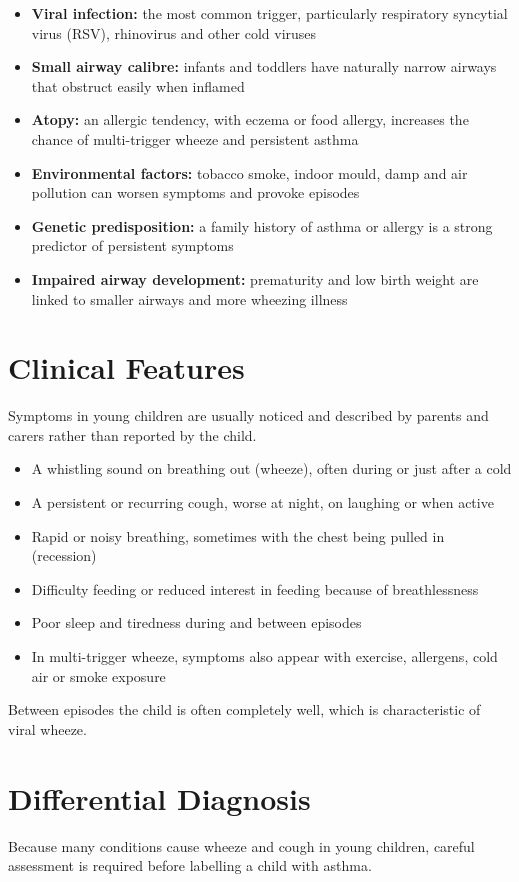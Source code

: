 \begin{itemize}
    \item \textbf{Viral infection:} the most common trigger, particularly respiratory syncytial virus (RSV), rhinovirus and other cold viruses
    \item \textbf{Small airway calibre:} infants and toddlers have naturally narrow airways that obstruct easily when inflamed
    \item \textbf{Atopy:} an allergic tendency, with eczema or food allergy, increases the chance of multi-trigger wheeze and persistent asthma
    \item \textbf{Environmental factors:} tobacco smoke, indoor mould, damp and air pollution can worsen symptoms and provoke episodes
    \item \textbf{Genetic predisposition:} a family history of asthma or allergy is a strong predictor of persistent symptoms
    \item \textbf{Impaired airway development:} prematurity and low birth weight are linked to smaller airways and more wheezing illness
\end{itemize}

\section*{Clinical Features}
Symptoms in young children are usually noticed and described by parents and carers rather than reported by the child.

\begin{itemize}
    \item A whistling sound on breathing out (wheeze), often during or just after a cold
    \item A persistent or recurring cough, worse at night, on laughing or when active
    \item Rapid or noisy breathing, sometimes with the chest being pulled in (recession)
    \item Difficulty feeding or reduced interest in feeding because of breathlessness
    \item Poor sleep and tiredness during and between episodes
    \item In multi-trigger wheeze, symptoms also appear with exercise, allergens, cold air or smoke exposure
\end{itemize}
Between episodes the child is often completely well, which is characteristic of viral wheeze.

\section*{Differential Diagnosis}
Because many conditions cause wheeze and cough in young children, careful assessment is required before labelling a child with asthma.

